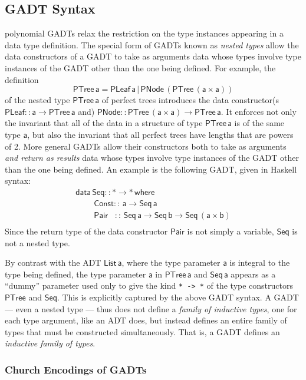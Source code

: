 \documentclass[acmsmall,screen,review,anonymous]{acmart}
\theoremstyle{definition}
\begin{document}
\subsection{GADT Syntax}\label{sec:gadts}

{\color{blue} polynomial} GADTs relax the restriction on the type
instances appearing in a data type definition. The special form of
GADTs known as {\em nested types} allow the data constructors of a
GADT to take as arguments data whose types involve type instances of
the GADT other than the one being defined. For example, the 
definition 
\[\mathsf{PTree \, a = PLeaf \,a \,|\, PNode \,(PTree\,(a \times
  a))}\] of the nested type $\mathsf{PTree\,a}$ of perfect trees
introduces the data constructor(s $\mathsf{PLeaf :: a \to PTree\,a}$
and) $\mathsf{PNode :: PTree \,(a\times a) \to PTree\,a}$. It enforces
not only the invariant that all of the data in a structure of type
$\mathsf{PTree\,a}$ is of the same type $\mathsf{a}$, but also the
invariant that all perfect trees have lengths that are powers of
2. More general GADTs allow their constructors both to take as
arguments {\em and return as results} data whose types involve type
instances of the GADT other than the one being defined. An example is
the following GADT, given in Haskell syntax:
\[\begin{array}{l}
\mathsf{data\, Seq :: * \to *\,where}\\
\mathsf{\;\;\;\;\;\;\;\;Const ::\, a \to Seq\,a}\\
\mathsf{\;\;\;\;\;\;\;\;Pair\,\,\,\,\, ::\, Seq \,a \to Seq\,b \to
  Seq\,(a \times b)}\\ 
\end{array}\]
Since the return type of the data constructor $\mathsf{Pair}$ is not
simply a variable, $\mathsf{Seq}$ is not a nested type.

By contrast with the ADT $\mathsf{List\, a}$, where the type parameter
$\mathsf{a}$ is integral to the type being defined, the type parameter
$\mathsf{a}$ in $\mathsf{PTree\,a}$ and $\mathsf{Seq\,a}$ appears as a
``dummy'' parameter used only to give the kind \verb|* -> *| of the
type constructors $\mathsf{PTree}$ and $\mathsf{Seq}$. This is
explicitly captured by the above GADT syntax. A GADT --- even a nested
type --- thus does not define a {\em family of inductive types}, one
for each type argument, like an ADT does, but instead defines an
entire family of types that must be constructed simultaneously. That
is, a GADT defines an {\em inductive family of types}.

\subsubsection{Church Encodings of GADTs}\label{sec:CEs}
\end{document}

